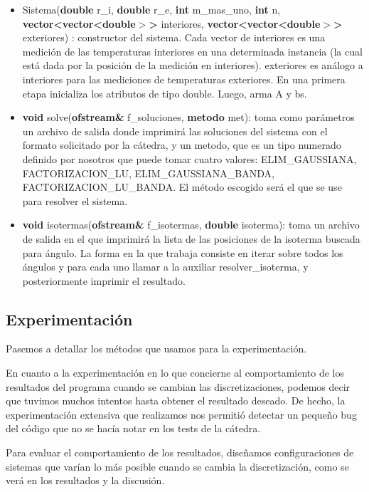 \begin{itemize}
	\item Sistema(\textbf{double} r\_i,
					\textbf{double} r\_e,
          \textbf{int} m\_mas\_uno,
          \textbf{int} n,
          \textbf{vector<vector<double$>$>} interiores,
          \textbf{vector<vector<double$>$>} exteriores)	:
  		constructor del sistema. Cada vector de interiores es una medición de las temperaturas interiores en una determinada instancia (la cual está dada por la posición de la medición en interiores). exteriores es análogo a interiores para las mediciones de temperaturas exteriores. En una primera etapa inicializa los atributos de tipo double. Luego, arma A y bs.
          
  \item \textbf{void} solve(\textbf{ofstream\&} f\_soluciones, \textbf{metodo} met):	toma como parámetros un archivo de salida donde imprimirá las soluciones del sistema con el formato solicitado por la cátedra, y un metodo, que es un tipo numerado definido por nosotros que puede tomar cuatro valores: ELIM\_GAUSSIANA, \mbox{FACTORIZACION\_LU,} ELIM\_GAUSSIANA\_BANDA, FACTORIZACION\_LU\_BANDA. El método escogido será el que se use para resolver el sistema.

  \item \textbf{void} isotermas(\textbf{ofstream\&} f\_isotermas, \textbf{double} isoterma): toma un archivo de salida en el que imprimirá la lista de las posiciones de la isoterma buscada para ángulo. La forma en la que trabaja consiste en iterar sobre todos los ángulos y para cada uno llamar a la auxiliar resolver\_isoterma, y posteriormente imprimir el resultado.   

\end{itemize}

\subsection{Experimentación}

Pasemos a detallar los métodos que usamos para la experimentación.

En cuanto a la experimentación en lo que concierne al comportamiento de los resultados del programa cuando se cambian las discretizaciones, podemos decir que tuvimos muchos intentos hasta obtener el resultado deseado. De hecho, la experimentación extensiva que realizamos nos permitió detectar un pequeño bug del código que no se hacía notar en los tests de la cátedra.

Para evaluar el comportamiento de los resultados, diseñamos configuraciones de sistemas que varían lo más posible cuando se cambia la discretización, como se verá en los resultados y la discusión.

